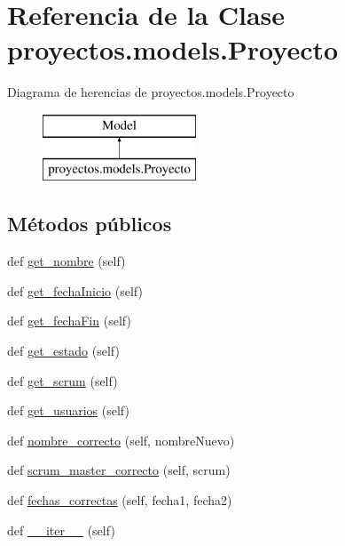 \hypertarget{classproyectos_1_1models_1_1_proyecto}{}\section{Referencia de la Clase proyectos.\+models.\+Proyecto}
\label{classproyectos_1_1models_1_1_proyecto}
Diagrama de herencias de proyectos.\+models.\+Proyecto\begin{figure}[H]
\begin{center}
\leavevmode
\includegraphics[height=2.000000cm]{classproyectos_1_1models_1_1_proyecto}
\end{center}
\end{figure}
\subsection*{Métodos públicos}
\begin{DoxyCompactItemize}
\item 
def \hyperlink{classproyectos_1_1models_1_1_proyecto_a08490a70901a6d07bb2c86b601246fe7}{get\+\_\+nombre} (self)
\item 
def \hyperlink{classproyectos_1_1models_1_1_proyecto_a4a5f95a864deff8360324a85702ca4be}{get\+\_\+fecha\+Inicio} (self)
\item 
def \hyperlink{classproyectos_1_1models_1_1_proyecto_ad26f9bee88c31c4d25e10bd8a6ec3e10}{get\+\_\+fecha\+Fin} (self)
\item 
def \hyperlink{classproyectos_1_1models_1_1_proyecto_a5e43fb0e66afd0fa59697958a04c7452}{get\+\_\+estado} (self)
\item 
def \hyperlink{classproyectos_1_1models_1_1_proyecto_a2e93deaf28f67912a944d6ffb70b0910}{get\+\_\+scrum} (self)
\item 
def \hyperlink{classproyectos_1_1models_1_1_proyecto_a57f9157d86710286744c0585f1d150c6}{get\+\_\+usuarios} (self)
\item 
def \hyperlink{classproyectos_1_1models_1_1_proyecto_aff2f57172ece9d914a3bc193d3b4864d}{nombre\+\_\+correcto} (self, nombre\+Nuevo)
\item 
def \hyperlink{classproyectos_1_1models_1_1_proyecto_aef41adaee4652b480f23a2bf76eb7bc0}{scrum\+\_\+master\+\_\+correcto} (self, scrum)
\item 
def \hyperlink{classproyectos_1_1models_1_1_proyecto_ab7566fe0b9b7d5ca26c41a1bc86d3d9e}{fechas\+\_\+correctas} (self, fecha1, fecha2)
\item 
def \hyperlink{classproyectos_1_1models_1_1_proyecto_ad6feeea517d80e04ad29f376e97046b2}{\+\_\+\+\_\+iter\+\_\+\+\_\+} (self)
\end{DoxyCompactItemize}
